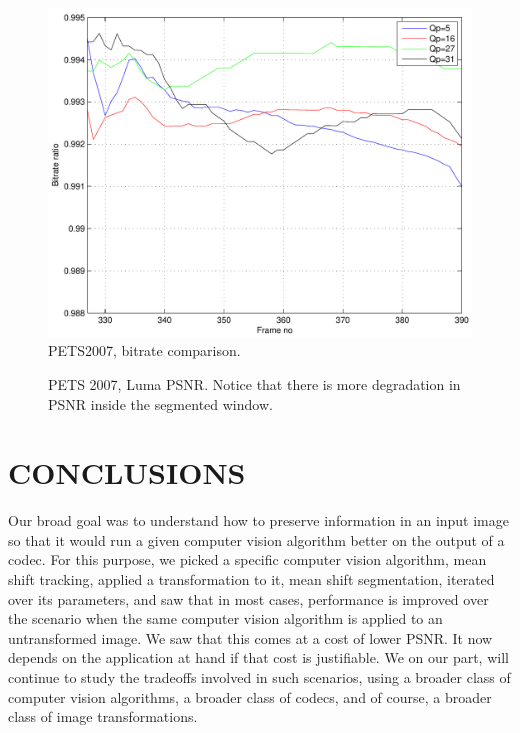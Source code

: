 \documentclass{article}
\begin{document}
\begin{figure}
			\centering
			\includegraphics[width=.22\textwidth]{figs/ICIP2009_PETS2007_bitRateRatio}
			\caption{PETS2007, bitrate comparison.}
			\label{fig:Bitrate_comparison_PETS2007}
			 					
\end{figure}

\begin{figure}
			\centering

			\caption{PETS 2007, Luma PSNR.  Notice that there is more degradation in PSNR inside the segmented window.} 	
			\label{fig:PSNR_Comparison_PETS2007}	
\end{figure}

\section{CONCLUSIONS}
Our broad goal was to understand how to preserve information in an input image so that it would run a given computer vision algorithm better on the output of a codec.  For this purpose, we picked a specific computer vision algorithm, mean shift tracking, applied a transformation to it, mean shift segmentation, iterated over its parameters, and saw that in most cases, performance is improved over the scenario when the same computer vision algorithm is applied to an untransformed image.  We saw that this comes at a cost of lower PSNR.  It now depends on the application at hand if that cost is justifiable.  We on our part, will continue to study the tradeoffs involved in such scenarios, using a broader class of computer vision algorithms, a broader class of codecs, and of course, a broader class of image transformations.




\end{document}
